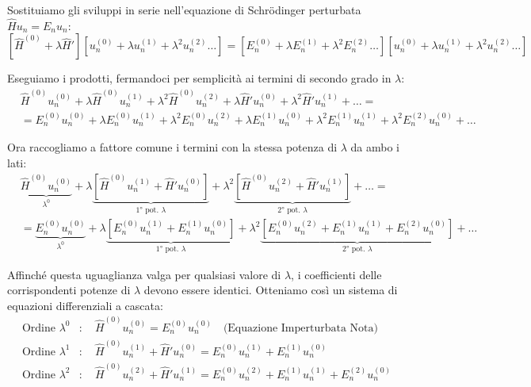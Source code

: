 \documentclass[11pt, a4paper]{article}
\begin{document}
Sostituiamo gli sviluppi in serie nell'equazione di Schrödinger perturbata $\hat{H} u_n = E_n u_n$: %
\begin{equation*}
    \left[ \hat{H}^{(0)} + \lambda \hat{H}' \right] \left[ u_n^{(0)} + \lambda u_n^{(1)} + \lambda^2 u_n^{(2)} \dots \right] = \left[ E_n^{(0)} + \lambda E_n^{(1)} + \lambda^2 E_n^{(2)} \dots \right] \left[ u_n^{(0)} + \lambda u_n^{(1)} + \lambda^2 u_n^{(2)} \dots \right] %
\end{equation*}

Eseguiamo i prodotti, fermandoci per semplicità ai termini di secondo grado in $\lambda$: %
\begin{align*}
    & \hat{H}^{(0)}u_n^{(0)} + \lambda\hat{H}^{(0)}u_n^{(1)} + \lambda^2\hat{H}^{(0)}u_n^{(2)} + \lambda\hat{H}'u_n^{(0)} + \lambda^2\hat{H}'u_n^{(1)} + \dots = \\ %
    &= E_n^{(0)}u_n^{(0)} + \lambda E_n^{(0)}u_n^{(1)} + \lambda^2 E_n^{(0)}u_n^{(2)} + \lambda E_n^{(1)}u_n^{(0)} + \lambda^2 E_n^{(1)}u_n^{(1)} + \lambda^2 E_n^{(2)}u_n^{(0)} + \dots %
\end{align*}

Ora raccogliamo a fattore comune i termini con la stessa potenza di $\lambda$ da ambo i lati: %
\begin{align*}
    & \underbrace{ \hat{H}^{(0)}u_n^{(0)} }_{\lambda^0} + \lambda \underbrace{ \left[ \hat{H}^{(0)}u_n^{(1)} + \hat{H}'u_n^{(0)} \right] }_{\text{1° pot. } \lambda} + \lambda^2 \underbrace{ \left[ \hat{H}^{(0)}u_n^{(2)} + \hat{H}'u_n^{(1)} \right] }_{\text{2° pot. } \lambda} + \dots = \\ %
    &= \underbrace{ E_n^{(0)}u_n^{(0)} }_{\lambda^0} + \lambda \underbrace{ \left[ E_n^{(0)}u_n^{(1)} + E_n^{(1)}u_n^{(0)} \right] }_{\text{1° pot. } \lambda} + \lambda^2 \underbrace{ \left[ E_n^{(0)}u_n^{(2)} + E_n^{(1)}u_n^{(1)} + E_n^{(2)}u_n^{(0)} \right] }_{\text{2° pot. } \lambda} + \dots %
\end{align*}

\noindent
Affinché questa uguaglianza valga per qualsiasi valore di $\lambda$, i coefficienti delle corrispondenti potenze di $\lambda$ devono essere identici. Otteniamo così un sistema di equazioni differenziali a cascata: %
\begin{align}
    \text{Ordine } \lambda^0 &: \quad \hat{H}^{(0)} u_n^{(0)} = E_n^{(0)} u_n^{(0)} \quad \text{(Equazione Imperturbata Nota)} \\ %
    \text{Ordine } \lambda^1 &: \quad \hat{H}^{(0)} u_n^{(1)} + \hat{H}' u_n^{(0)} = E_n^{(0)} u_n^{(1)} + E_n^{(1)} u_n^{(0)} \\ %
    \text{Ordine } \lambda^2 &: \quad \hat{H}^{(0)} u_n^{(2)} + \hat{H}' u_n^{(1)} = E_n^{(0)} u_n^{(2)} + E_n^{(1)} u_n^{(1)} + E_n^{(2)} u_n^{(0)} %
\end{align}
\end{document}

